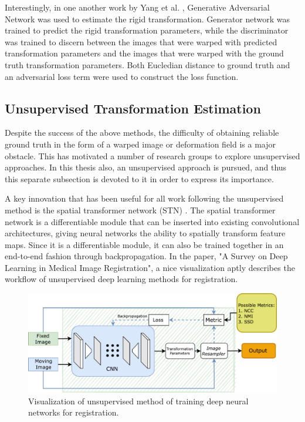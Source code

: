 \documentclass{report}
\begin{document}
	Interestingly, in one another work by Yang et al. \cite{https://doi.org/10.48550/arxiv.1804.11024}, Generative Adversarial Network was used to estimate the rigid transformation. Generator network was trained to predict the rigid transformation parameters, while the discriminator was trained to discern between the images that were warped with predicted transformation parameters and the images that were warped with the ground truth transformation parameters. Both Eucledian distance to ground truth and an adversarial loss term were used to construct the loss function.
	
	\subsection{Unsupervised Transformation Estimation}
	Despite the success of the above methods, the difficulty of obtaining reliable ground truth in the form of a warped image or deformation field is a major obstacle. This has motivated a number of research groups to explore unsupervised approaches. In this thesis also, an unsupervised approach is pursued, and thus this separate subsection is devoted to it in order to express its importance.
	
	A key innovation that has been useful for all work following the unsupervised method is the spatial transformer network (STN) \cite{NIPS2015_33ceb07b}. The spatial transformer network is a differentiable module that can be inserted into existing convolutional architectures, giving neural networks the ability to spatially transform feature maps. Since it is a differentiable module, it can also be trained together in an end-to-end fashion through backpropagation. In the paper, "A Survey on Deep Learning in Medical Image Registration", \cite{Haskins_2020} a nice visualization aptly describes the workflow of unsupervised deep learning methods for registration.
	
	\begin{figure}[h]
		\centering
		\includegraphics[width=0.9\columnwidth]{resources/chapter2/unsupervised_visualization.pdf}
		\caption{Visualization of unsupervised method of training deep neural networks for registration. \cite{Haskins_2020}}
		\label{fig:unsupervised_visualization}
	\end{figure}
	
\end{document}
